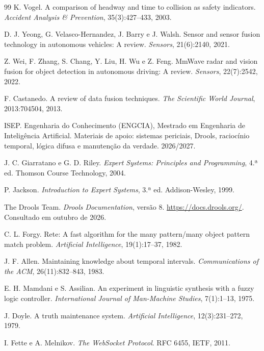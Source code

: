 \begin{thebibliography}{99}
 K. Vogel. A comparison of headway and time to collision as safety indicators. \emph{Accident Analysis \& Prevention}, 35(3):427–433, 2003.

 D. J. Yeong, G. Velasco-Hernandez, J. Barry e J. Walsh. Sensor and sensor fusion technology in autonomous vehicles: A review. \emph{Sensors}, 21(6):2140, 2021.

 Z. Wei, F. Zhang, S. Chang, Y. Liu, H. Wu e Z. Feng. MmWave radar and vision fusion for object detection in autonomous driving: A review. \emph{Sensors}, 22(7):2542, 2022.

 F. Castanedo. A review of data fusion techniques. \emph{The Scientific World Journal}, 2013:704504, 2013.

 ISEP. Engenharia do Conhecimento (ENGCIA), Mestrado em Engenharia de Inteligência Artificial. Materiais de apoio: sistemas periciais, Drools, raciocínio temporal, lógica difusa e manutenção da verdade. 2026/2027.

 J. C. Giarratano e G. D. Riley. \emph{Expert Systems: Principles and Programming}, 4.ª ed. Thomson Course Technology, 2004.

 P. Jackson. \emph{Introduction to Expert Systems}, 3.ª ed. Addison-Wesley, 1999.

 The Drools Team. \emph{Drools Documentation}, versão 8. \url{https://docs.drools.org/}. Consultado em outubro de 2026.

 C. L. Forgy. Rete: A fast algorithm for the many pattern/many object pattern match problem. \emph{Artificial Intelligence}, 19(1):17–37, 1982.

 J. F. Allen. Maintaining knowledge about temporal intervals. \emph{Communications of the ACM}, 26(11):832–843, 1983.

 E. H. Mamdani e S. Assilian. An experiment in linguistic synthesis with a fuzzy logic controller. \emph{International Journal of Man-Machine Studies}, 7(1):1–13, 1975.

 J. Doyle. A truth maintenance system. \emph{Artificial Intelligence}, 12(3):231–272, 1979.

 I. Fette e A. Melnikov. \emph{The WebSocket Protocol}. RFC 6455, IETF, 2011.

\end{thebibliography}
